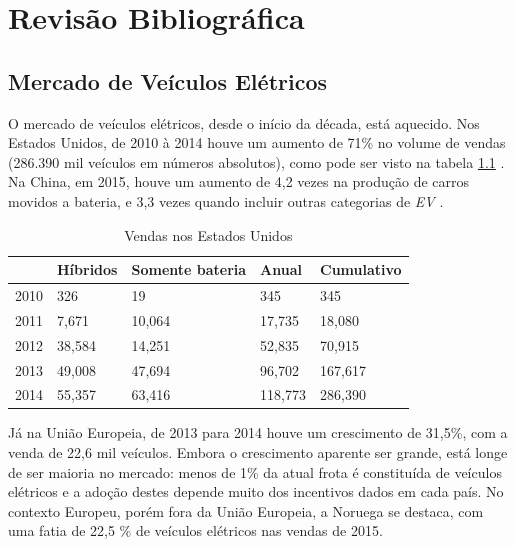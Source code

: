 \chapter{Revisão Bibliográfica}
\label{stateofart}

  \section{Mercado de Veículos Elétricos}
  \label{stateofart:market}

    O mercado de veículos elétricos, desde o início da década, está aquecido. Nos Estados Unidos, de 2010 à 2014 houve um aumento de 71\% no volume de vendas (286.390 mil veículos em números absolutos), como pode ser visto na tabela \ref{table:american-sales} \cite{fsec-report-ev}. Na China, em 2015, houve um aumento de 4,2 vezes na produção de carros movidos a bateria, e 3,3 vezes quando incluir outras categorias de \textit{\ac{EV}} \cite{caam-report-ev}.

    \begin{table}[]
    \centering
    \caption{Vendas nos Estados Unidos}
    \label{table:american-sales}
    \begin{tabular}{@{}lllll@{}}
    \toprule
    \textbf{} & \textbf{Híbridos} & \textbf{Somente bateria} & \textbf{Anual} & \textbf{Cumulativo} \\ \midrule
    2010             & 326                       & 19                      & 345             & 345                  \\
    2011             & 7,671                     & 10,064                  & 17,735          & 18,080                \\
    2012             & 38,584                    & 14,251                  & 52,835          & 70,915                \\
    2013             & 49,008                    & 47,694                  & 96,702          & 167,617               \\
    2014             & 55,357                    & 63,416                  & 118,773         & 286,390               \\ \bottomrule
    \end{tabular}
    \end{table}

    Já na União Europeia, de 2013 para 2014 houve um crescimento de 31,5\%, com a venda de 22,6 mil veículos. Embora o crescimento aparente ser grande, está longe de ser maioria no mercado: menos de 1\% da atual frota é constituída de veículos elétricos e a adoção destes depende muito dos incentivos dados em cada país. No contexto Europeu, porém fora da União Europeia, a Noruega se destaca, com uma fatia de 22,5 \% de veículos elétricos nas vendas de 2015. \cite{eaa-report-ev}

